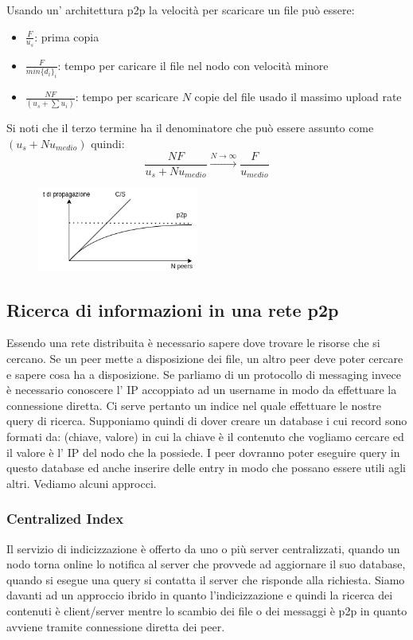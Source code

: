 Usando un' architettura p2p la velocità per scaricare un file può essere:
\begin{itemize}
    \item $\frac{F}{u_s}$: prima copia
    \item $\frac{F}{min\{d_i\}_i}$: tempo per caricare il file nel nodo con velocità minore
    \item $\frac{NF}{\left( u_s + \sum u_i \right)}$: tempo per scaricare $N$ copie del file usado il massimo upload rate
\end{itemize}
Si noti che il terzo termine ha il denominatore che può essere assunto come $\left( u_s + Nu_{medio}\right)$ quindi:
$$ \frac{NF}{u_s + Nu_{medio}} \xrightarrow{N \xrightarrow{} \infty} \frac{F}{u_{medio}} $$
\begin{figure}[H]
    \centering
    \includegraphics[width=200px]{images/2_Applicazioni_di_rete/comparazione_cs_p2p.png}
\end{figure}

\subsection{Ricerca di informazioni in una rete p2p}
Essendo una rete distribuita è necessario sapere dove trovare le risorse che si cercano.
Se un peer mette a disposizione dei file, un altro peer deve poter cercare e sapere cosa ha a disposizione.
Se parliamo di un protocollo di messaging invece è necessario conoscere l' IP accoppiato ad un username in modo da effettuare la connessione diretta.
Ci serve pertanto un indice nel quale effettuare le nostre query di ricerca.
Supponiamo quindi di dover creare un database i cui record sono formati da: (chiave, valore) in cui la chiave è il contenuto che vogliamo cercare ed il valore è l' IP del nodo che la possiede.
I peer dovranno poter eseguire query in questo database ed anche inserire delle entry in modo che possano essere utili agli altri.
Vediamo alcuni approcci.

\subsubsection{Centralized Index}
Il servizio di indicizzazione è offerto da uno o più server centralizzati, quando un nodo torna online lo notifica al server che provvede ad aggiornare il suo database, quando si esegue una query si contatta il server che risponde alla richiesta.
Siamo davanti ad un approccio ibrido in quanto l'indicizzazione e quindi la ricerca dei contenuti è client/server mentre lo scambio dei file o dei messaggi è p2p in quanto avviene tramite connessione diretta dei peer.

